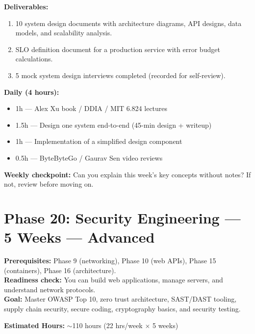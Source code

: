 \documentclass[11pt, a4paper, oneside]{report}
\begin{document}
\begin{milestonebox}
\textbf{Deliverables:}
\begin{enumerate}[leftmargin=*]
\item 10 system design documents with architecture diagrams, API designs, data models, and scalability analysis.
\item SLO definition document for a production service with error budget calculations.
\item 5 mock system design interviews completed (recorded for self-review).
\end{enumerate}
\end{milestonebox}

\begin{practicebox}
\textbf{Daily (4 hours):}
\begin{itemize}[leftmargin=*]
\item 1h --- Alex Xu book / DDIA / MIT 6.824 lectures
\item 1.5h --- Design one system end-to-end (45-min design + writeup)
\item 1h --- Implementation of a simplified design component
\item 0.5h --- ByteByteGo / Gaurav Sen video reviews
\end{itemize}


\textbf{Weekly checkpoint:} Can you explain this week's key concepts without notes? If not, review before moving on.
\end{practicebox}

\clearpage
\section[Phase 20: Security]{Phase 20: Security Engineering --- 5 Weeks --- Advanced}

\begin{prereqbox}
\textbf{Prerequisites:} Phase 9 (networking), Phase 10 (web APIs), Phase 15 (containers), Phase 16 (architecture).\\
\textbf{Readiness check:} You can build web applications, manage servers, and understand network protocols.\\
\textbf{Goal:} Master OWASP Top 10, zero trust architecture, SAST/DAST tooling, supply chain security, secure coding, cryptography basics, and security testing.


\textbf{Estimated Hours:} $\sim$110 hours (22 hrs/week $\times$ 5 weeks)
\end{prereqbox}
\end{document}
